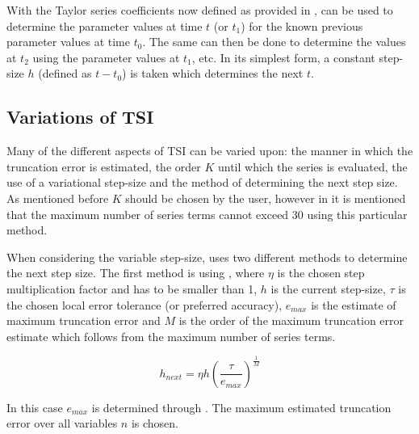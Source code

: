 With the Taylor series coefficients now defined as provided in ,  can be used to determine the parameter values at time $t$ (or $t_{1}$) for the known previous parameter values at time $t_{0}$. The same can then be done to determine the values at $t_{2}$ using the parameter values at $t_{1}$, etc. In its simplest form, a constant step-size $h$ (defined as $t-t_{0}$) is taken which determines the next $t$.


\subsection{Variations of \ac{TSI}}
\label{subsec:vartsi}
Many of the different aspects of \ac{TSI} can be varied upon: the manner in which the truncation error is estimated, the order $K$ until which the series is evaluated, the use of a variational step-size and the method of determining the next step size.\\

As mentioned before $K$ should be chosen by the user, however in \cite{scott2008high} it is mentioned that the maximum number of series terms cannot exceed 30 using this particular method. 

When considering the variable step-size, \cite{scott2008high} uses two different methods to determine the next step size. The first method is using , where $\eta$ is the chosen step multiplication factor and has to be smaller than 1, $h$ is the current step-size, $\tau$ is the chosen local error tolerance (or preferred accuracy), $e_{max}$ is the estimate of maximum truncation error and $M$ is the order of the maximum truncation error estimate which follows from the maximum number of series terms.



\begin{equation} \label{eq:stand_stsi}
h_{next}=\eta h\left(\dfrac{\tau}{e_{max}}\right)^{\frac{1}{M}}
\end{equation} 

In this case $e_{max}$ is determined through . The maximum estimated truncation error over all variables $n$ is chosen.

